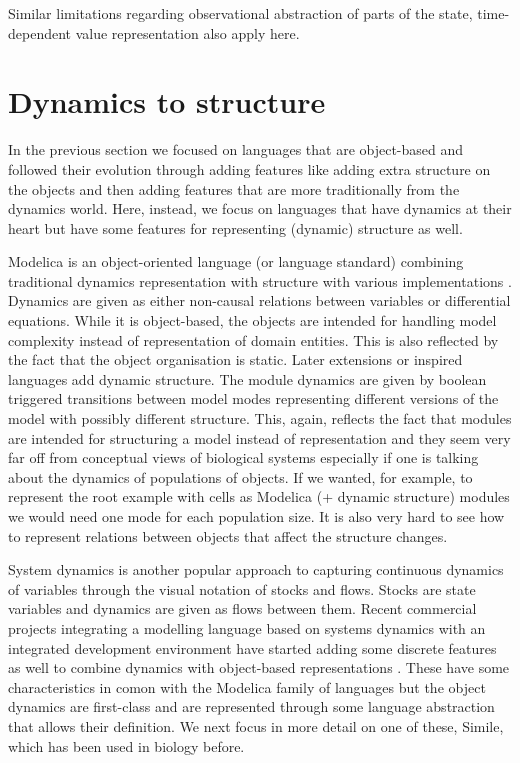 Similar limitations regarding observational abstraction of parts of the state,
time-dependent value representation also apply here.

\section{Dynamics to structure}
\label{sec:dyns}
In the previous section we focused on languages that are object-based and
followed their evolution through adding features like adding extra structure on
the objects and then adding features that are more traditionally from the
dynamics world. Here, instead, we focus on languages that have dynamics at their
heart but have some features for representing (dynamic) structure as
well.

Modelica is an object-oriented language (or language standard) combining
traditional dynamics representation with structure
\citep{fritzson_modelicaunified_1998} with various implementations
\citep{otter_modeling_1996, li_hybrid_2007}. Dynamics are given as either
non-causal relations between variables or differential equations. While it is
object-based, the objects are intended for handling model complexity instead of
representation of domain entities. This is also reflected by the fact that the
object organisation is static. Later extensions
\citep{nytsch-geusen_mosilab:_2005} or inspired languages
\citep{zimmer2008introducing} add dynamic structure. The module dynamics are
given by boolean triggered transitions between model modes representing
different versions of the model with possibly different structure. This, again,
reflects the fact that modules are intended for structuring a model instead of
representation and they seem very far off from conceptual views of biological
systems especially if one is talking about the dynamics of populations of
objects. If we wanted, for example, to represent the root example with cells as
Modelica (+ dynamic structure) modules we would need one mode for each
population size. It is also very hard to see how to represent relations between
objects that affect the structure changes.

System dynamics is another popular approach to capturing continuous dynamics of
variables through the visual notation of stocks and flows. Stocks are state
variables and dynamics are given as flows between them. Recent commercial
projects integrating a modelling language based on systems dynamics with an
integrated development environment have started adding some discrete features as
well to combine dynamics with object-based representations \citep[Ventity,
AnyLogic;][]{yeager_entity-based_2014, borshchev2004system}. These have some
characteristics in comon with the Modelica family of languages but the object
dynamics are first-class and are represented through some language abstraction
that allows their definition. We next focus in more detail on one of these,
Simile, which has been used in biology before.


